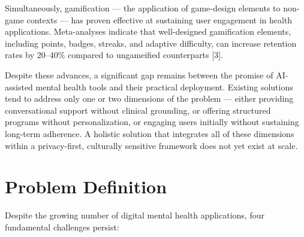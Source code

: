 \documentclass[
  letterpaper,
  12pt,
  a4paper,
  openany]{report}
\begin{document}
Simultaneously, gamification --- the application of game-design elements
to non-game contexts --- has proven effective at sustaining user
engagement in health applications. Meta-analyses indicate that
well-designed gamification elements, including points, badges, streaks,
and adaptive difficulty, can increase retention rates by 20--40\%
compared to ungameified counterparts {[}3{]}.

Despite these advances, a significant gap remains between the promise of
AI-assisted mental health tools and their practical deployment. Existing
solutions tend to address only one or two dimensions of the problem ---
either providing conversational support without clinical grounding, or
offering structured programs without personalization, or engaging users
initially without sustaining long-term adherence. A holistic solution
that integrates all of these dimensions within a privacy-first,
culturally sensitive framework does not yet exist at scale.

\section{Problem Definition}\label{sec-problem-definition}

Despite the growing number of digital mental health applications, four
fundamental challenges persist:
\end{document}
